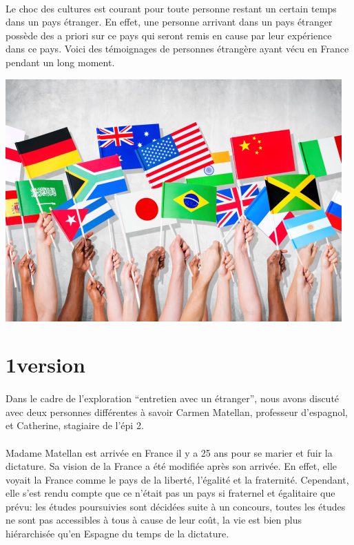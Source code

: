 \paragraph{} Le choc des cultures est courant pour toute personne restant un
certain temps dans un pays étranger. En effet, une personne arrivant dans un
pays étranger possède des a priori sur ce pays qui seront remis en cause par
leur expérience dans ce pays. Voici des témoignages de personnes étrangère
ayant vécu en France pendant un long moment.

\begin{center}
	\includegraphics[scale=0.5]{entretien.jpg}
\end{center}

\section{1\iere version}

\paragraph{} Dans le cadre de l'exploration ``entretien avec un étranger'',
nous avons discuté avec deux personnes différentes à savoir Carmen Matellan,
professeur d'espagnol, et Catherine, stagiaire de l'épi 2.

\paragraph{} Madame Matellan est arrivée en France il y a 25 ans pour se marier
et fuir la dictature. Sa vision de la France a été modifiée après son arrivée.
En effet, elle voyait la France comme le pays de la liberté, l'égalité et la
fraternité. Cependant, elle s'est rendu compte que ce n'était pas un pays si
fraternel et égalitaire que prévu: les études poursuivies sont décidées suite à
un concours, toutes les études ne sont pas accessibles à tous à cause de leur
coût, la vie est bien plus hiérarchisée qu'en Espagne du temps de la dictature.

